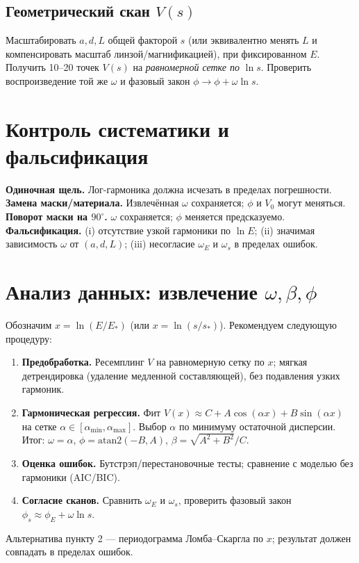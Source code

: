 \documentclass[a4paper,12pt]{article}
\begin{document}
\subsection{Геометрический скан $V(s)$}
Масштабировать $a,d,L$ общей факторой $s$ (или эквивалентно менять $L$ и компенсировать масштаб линзой/магнификацией),
при фиксированном $E$. Получить 10--20 точек $V(s)$ на \emph{равномерной сетке по} $\ln s$.
Проверить воспроизведение той же $\omega$ и фазовый закон $\phi\to\phi+\omega\ln s$.

\section{Контроль систематики и фальсификация}
\textbf{Одиночная щель.} Лог-гармоника должна исчезать в пределах погрешности.\\
\textbf{Замена маски/материала.} Извлечённая $\omega$ сохраняется; $\phi$ и $V_0$ могут меняться.\\
\textbf{Поворот маски на $90^{\circ}$.} $\omega$ сохраняется; $\phi$ меняется предсказуемо.\\
\textbf{Фальсификация.} (i) отсутствие узкой гармоники по $\ln E$; (ii) значимая зависимость $\omega$ от $(a,d,L)$;
(iii) несогласие $\omega_E$ и $\omega_s$ в пределах ошибок.

\section{Анализ данных: извлечение $\omega,\beta,\phi$}
Обозначим $x=\ln(E/E_{\ast})$ (или $x=\ln(s/s_{\ast})$). Рекомендуем следующую процедуру:
\begin{enumerate}
  \item \textbf{Предобработка.} Ресемплинг $V$ на равномерную сетку по $x$; мягкая детрендировка (удаление медленной составляющей),
  без подавления узких гармоник.
  \item \textbf{Гармоническая регрессия.} Фит $V(x)\approx C+A\cos(\alpha x)+B\sin(\alpha x)$ на сетке $\alpha\in[\alpha_{\min},\alpha_{\max}]$.
  Выбор $\alpha$ по минимуму остаточной дисперсии. Итог: $\omega=\alpha$, $\phi=\mathrm{atan2}(-B,A)$, $\beta=\sqrt{A^2+B^2}/C$.
  \item \textbf{Оценка ошибок.} Бутстрэп/перестановочные тесты; сравнение с моделью без гармоники (AIC/BIC).
  \item \textbf{Согласие сканов.} Сравнить $\omega_E$ и $\omega_s$, проверить фазовый закон $\phi_s\approx\phi_E+\omega\ln s$.
\end{enumerate}
Альтернатива пункту 2 --- периодограмма Ломба–Скаргла по $x$; результат должен совпадать в пределах ошибок.
\end{document}

